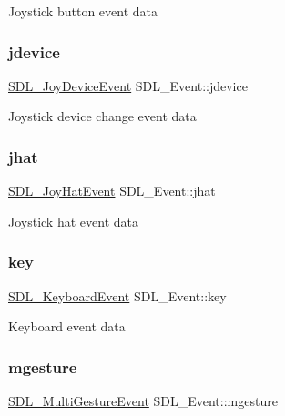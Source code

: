 Joystick button event data \mbox{\label{union_s_d_l___event_a17514dc19a846ea1b5fbe44123700c4c}} 
\subsubsection{\texorpdfstring{jdevice}{jdevice}}
{\footnotesize\ttfamily \mbox{\hyperlink{struct_s_d_l___joy_device_event}{S\+D\+L\+\_\+\+Joy\+Device\+Event}} S\+D\+L\+\_\+\+Event\+::jdevice}

Joystick device change event data \mbox{\label{union_s_d_l___event_a421b40e0f8e01f181c8d5548cff1dd1d}} 
\subsubsection{\texorpdfstring{jhat}{jhat}}
{\footnotesize\ttfamily \mbox{\hyperlink{struct_s_d_l___joy_hat_event}{S\+D\+L\+\_\+\+Joy\+Hat\+Event}} S\+D\+L\+\_\+\+Event\+::jhat}

Joystick hat event data \mbox{\label{union_s_d_l___event_ab99927835cc77a9b6bb50b419b4a27df}} 
\subsubsection{\texorpdfstring{key}{key}}
{\footnotesize\ttfamily \mbox{\hyperlink{struct_s_d_l___keyboard_event}{S\+D\+L\+\_\+\+Keyboard\+Event}} S\+D\+L\+\_\+\+Event\+::key}

Keyboard event data \mbox{\label{union_s_d_l___event_ac19b3c6a6b5181a51eb4fbe2cbe726a9}} 
\subsubsection{\texorpdfstring{mgesture}{mgesture}}
{\footnotesize\ttfamily \mbox{\hyperlink{struct_s_d_l___multi_gesture_event}{S\+D\+L\+\_\+\+Multi\+Gesture\+Event}} S\+D\+L\+\_\+\+Event\+::mgesture}

